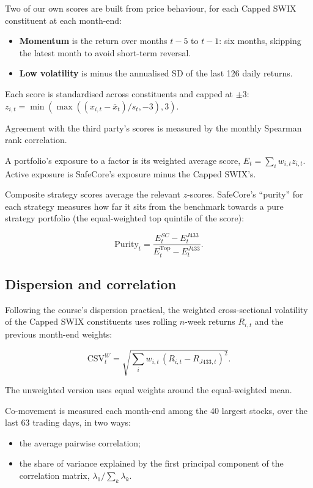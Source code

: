 \documentclass[11pt,preprint]{elsarticle}
\numberwithin{equation}{section}
\numberwithin{figure}{section}
\numberwithin{table}{section}
\def\tightlist{} %
\begin{document}
Two of our own scores are built from price behaviour, for each Capped
SWIX constituent at each month-end:

\begin{itemize}
\tightlist
\item
  \textbf{Momentum} is the return over months \(t-5\) to \(t-1\): six
  months, skipping the latest month to avoid short-term reversal.
\item
  \textbf{Low volatility} is minus the annualised SD of the last 126
  daily returns.
\end{itemize}

Each score is standardised across constituents and capped at \(\pm 3\):
\(z_{i,t} = \min(\max((x_{i,t}-\bar{x}_t)/s_t, -3), 3)\).

Agreement with the third party's scores is measured by the monthly
Spearman rank correlation.

A portfolio's exposure to a factor is its weighted average score,
\(E_t = \sum_i w_{i,t}z_{i,t}\). Active exposure is SafeCore's exposure
minus the Capped SWIX's.

Composite strategy scores average the relevant \(z\)-scores. SafeCore's
``purity'' for each strategy measures how far it sits from the benchmark
towards a pure strategy portfolio (the equal-weighted top quintile of
the score):

\[
\text{Purity}_t = \frac{E^{SC}_t - E^{J433}_t}{E^{\text{Top}}_t - E^{J433}_t}.
\]

\subsection{Dispersion and
correlation}\label{dispersion-and-correlation}

Following the course's dispersion practical, the weighted
cross-sectional volatility of the Capped SWIX constituents uses rolling
\(n\)-week returns \(R_{i,t}\) and the previous month-end weights:

\[
\text{CSV}^{W}_t = \sqrt{\sum_i w_{i,t}\,(R_{i,t} - R_{J433,t})^2}.
\]

The unweighted version uses equal weights around the equal-weighted
mean.

Co-movement is measured each month-end among the 40 largest stocks, over
the last 63 trading days, in two ways:

\begin{itemize}
\tightlist
\item
  the average pairwise correlation;
\item
  the share of variance explained by the first principal component of
  the correlation matrix, \(\lambda_1/\sum_k\lambda_k\).
\end{itemize}
\end{document}
